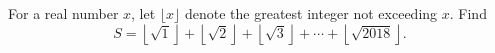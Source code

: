For a real number $x$, let $\lfloor x\rfloor$ denote the greatest integer not exceeding $x$. Find
\[
S=\left\lfloor\sqrt1\right\rfloor+\left\lfloor\sqrt2\right\rfloor+\left\lfloor\sqrt3\right\rfloor+\cdots+\left\lfloor\sqrt{2018}\right\rfloor .
\]

